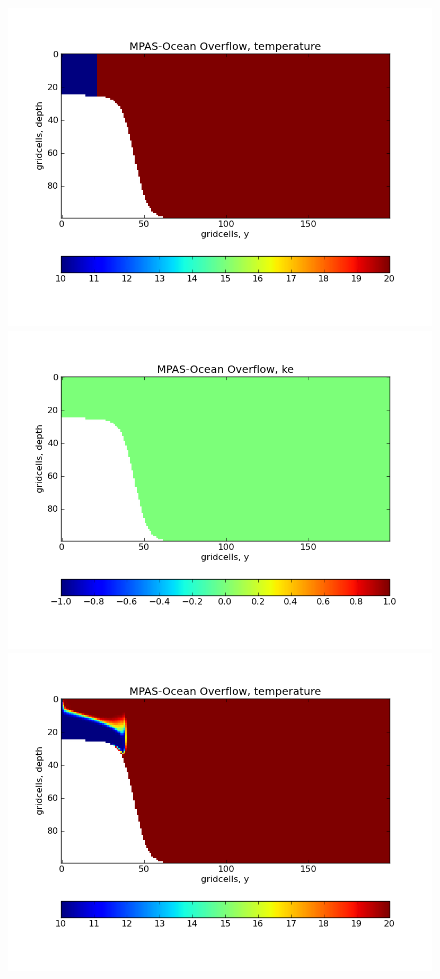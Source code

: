 \begin{figure}[H]
	\centering
	\includegraphics[scale=0.4]{ocean/figures/MPAS-O_overflow_temperature_0hrs.png}
	\includegraphics[scale=0.4]{ocean/figures/MPAS-O_overflow_ke_0hrs.png}\\
	\includegraphics[scale=0.4]{ocean/figures/MPAS-O_overflow_temperature_3hrs.png}

\end{figure}
